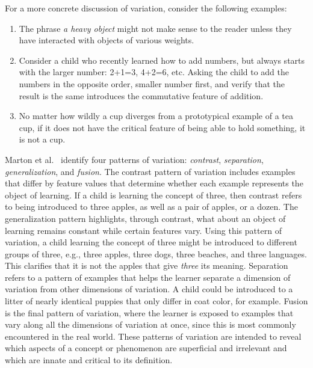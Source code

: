 
For a more concrete discussion of variation, consider the following examples:
\begin{enumerate}
\item The phrase {\it a heavy object} might not make sense to the reader unless they have interacted with objects of various weights.
\item Consider a child who recently learned how to add numbers, but always starts with the larger number: 2+1=3, 4+2=6, etc. Asking the child to add the numbers in the opposite order, smaller number first, and verify that the result is the same introduces the commutative feature of addition.
\item No matter how wildly a cup diverges from a prototypical example of a tea cup, if it does not have the critical feature of being able to hold something, it is not a cup.
\end{enumerate}

Marton et al.~\cite{marton1997learning} identify four patterns of variation: {\it contrast}, {\it separation}, {\it generalization}, and {\it fusion}. The contrast pattern of variation includes examples that differ by feature values that determine whether each example represents the object of learning. If a child is learning the concept of three, then contrast refers to being introduced to three apples, as well as a pair of apples, or a dozen. The generalization pattern highlights, through contrast, what about an object of learning remains constant while certain features vary. Using this pattern of variation, a child learning the concept of three might be introduced to different groups of three, e.g., three apples, three dogs, three beaches, and three languages. This clarifies that it is not the apples that give {\it three} its meaning. Separation refers to a pattern of examples that helps the learner separate a dimension of variation from other dimensions of variation. A child could be introduced to a litter of nearly identical puppies that only differ in coat color, for example. Fusion is the final pattern of variation, where the learner is exposed to examples that vary along all the dimensions of variation at once, since this is most commonly encountered in the real world. These patterns of variation are intended to reveal which aspects of a concept or phenomenon are superficial and irrelevant and which are innate and critical to its definition.

